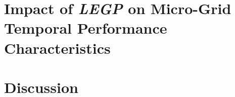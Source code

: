\documentclass{article}
\begin{document}
\section{Impact of \emph{LEGP} on Micro-Grid Temporal Performance Characteristics}



\section{Discussion}
\end{document}
